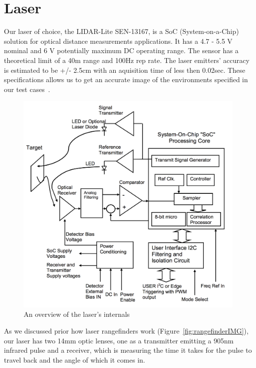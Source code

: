 \clearpage
\section{Laser} %

Our laser of choice, the LIDAR-Lite SEN-13167, is a SoC (System-on-a-Chip) solution for optical distance measurements applications. It has a 4.7 - 5.5 V nominal and 6 V potentially maximum DC operating range. The sensor has a theoretical limit of a 40m range and 100Hz rep rate. The laser emitters' accuracy is estimated to be +/- 2.5cm with an aquisition time of less then 0.02sec. These specifications allows us to get an accurate image of the environments specified in our test cases~\cite{lidarsum}.

\begin{figure}[H]
	\centering
	\includegraphics[scale=.4]{images/internallidar.png}
	\caption{An overview of the laser's internals}
	\label{fig:internallidar}
\end{figure}

As we discussed prior how laser rangefinders work (Figure~\ref{fig:rangefinderIMG}), our laser has two 14mm optic lenses, one as a transmitter emitting a 905nm infrared pulse and a receiver, which is measuring the time it takes for the pulse to travel back and the angle of which it comes in.

